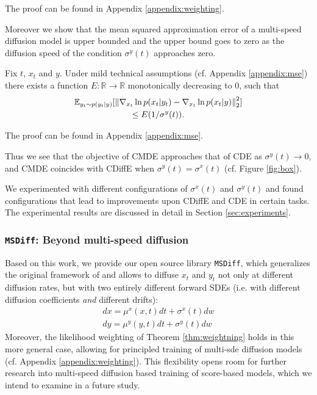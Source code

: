 \noindent
The proof can be found in Appendix \ref{appendix:weighting}. 

Moreover we show that the mean squared approximation error of a multi-speed diffusion model is upper bounded and the upper bound goes to zero as the diffusion speed of the condition $\sigma^y(t)$ approaches zero.
\begin{theorem}
    Fix $t$, $x_t$ and $y$. Under mild technical assumptions (cf. Appendix \ref{appendix:mse}) there exists a function  $E: \mathbb{R} \xrightarrow{} \mathbb{R}$ monotonically decreasing to $0$, such that
    \begin{gather*}
        \mathbb{E}_{y_t \sim p(y_t|y)}[
            \left\lVert  \nabla_{x_t} \ln p(x_t|y_t) - \nabla_{x_t} \ln p(x_t|y) \right\rVert_2^2
            ] \\
            \leq E(1/\sigma^y(t)).
    \end{gather*}
\end{theorem}
\noindent
The proof can be found in Appendix \ref{appendix:mse}.

Thus we see that the objective of CMDE approaches that of CDE as  $\sigma^y(t) \to 0$, and  CMDE coincides with CDiffE when $ \sigma^y(t) = \sigma^x(t)$ (cf. Figure \ref{fig:box}).

We experimented with different configurations of $\sigma^x(t)$ and $\sigma^y(t)$ and found configurations that lead to  improvements upon CDiffE and  CDE in certain tasks. The experimental results are discussed in detail in Section \ref{sec:experiments}.

\subsubsection{\texttt{MSDiff}: Beyond multi-speed diffusion}
\label{sec:multi-sde}

Based on this work, we provide our open source library \texttt{MSDiff}, which generalizes the original framework of \cite{song2021sde} and allows to diffuse $x_t$ and $y_t$ not only at different diffusion rates, but with two entirely different forward SDEs (i.e. with different diffusion coefficients \emph{and} different drifts):
\begin{gather*}
    dx = \mu^x(x,t)dt+\sigma^x(t)dw  \\
    dy = \mu^y(y,t)dt+\sigma^y(t)dw  
\end{gather*}
Moreover, the likelihood weighting of Theorem \ref{thm:weightning} holds in this more general case, allowing for principled training of multi-sde diffusion models (cf. Appendix \ref{appendix:weighting}).
This flexibility opens room for further research into multi-speed diffusion based training of score-based models, which we intend to examine in a future study. 

